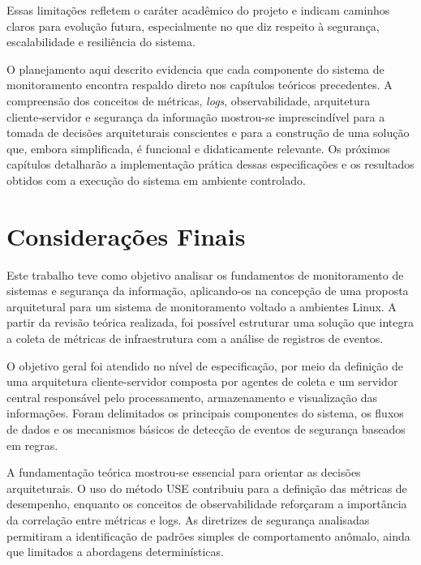 \documentclass[
    12pt
    ,oneside
    ,a4paper
    ,chapter=TITLE
    ,section=TITLE
    ,sumario=abnt-6027-2012]{abntex2}
\begin{document}
Essas limitações refletem o caráter acadêmico do projeto e indicam caminhos claros para evolução futura, especialmente no que diz respeito à segurança, escalabilidade e resiliência do sistema.

O planejamento aqui descrito evidencia que cada componente do sistema de monitoramento encontra respaldo direto nos capítulos teóricos precedentes. A compreensão dos conceitos de métricas, \textit{logs}, observabilidade, arquitetura cliente‑servidor e segurança da informação mostrou-se imprescindível para a tomada de decisões arquiteturais conscientes e para a construção de uma solução que, embora simplificada, é funcional e didaticamente relevante. Os próximos capítulos detalharão a implementação prática dessas especificações e os resultados obtidos com a execução do sistema em ambiente controlado.


\chapter{Considerações Finais}
\label{cap:conclusao}

Este trabalho teve como objetivo analisar os fundamentos de monitoramento de sistemas 
e segurança da informação, aplicando-os na concepção de uma proposta arquitetural para 
um sistema de monitoramento voltado a ambientes Linux. A partir da revisão teórica 
realizada, foi possível estruturar uma solução que integra a coleta de métricas de 
infraestrutura com a análise de registros de eventos.

O objetivo geral foi atendido no nível de especificação, por meio da definição de uma 
arquitetura cliente-servidor composta por agentes de coleta e um servidor central 
responsável pelo processamento, armazenamento e visualização das informações. Foram 
delimitados os principais componentes do sistema, os fluxos de dados e os mecanismos 
básicos de detecção de eventos de segurança baseados em regras.

A fundamentação teórica mostrou-se essencial para orientar as decisões arquiteturais. 
O uso do método USE contribuiu para a definição das métricas de desempenho, enquanto os 
conceitos de observabilidade reforçaram a importância da correlação entre métricas e 
logs. As diretrizes de segurança analisadas permitiram a identificação de padrões 
simples de comportamento anômalo, ainda que limitados a abordagens determinísticas.
\end{document}

